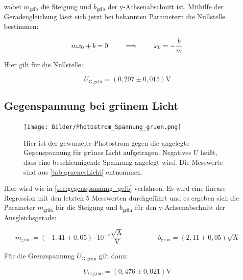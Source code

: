 \documentclass[titlepage = firstcover]{scrartcl}
\begin{document}
            wobei $m_{\text{gelb}}$ die Steigung und $b_{\text{gelb}}$ der y-Achsenabschnitt ist.
            Mithilfe der Geradengleichung lässt sich jetzt bei bekannten Parametern die Nullstelle bestimmen:

            \begin{equation}
              m x_0 + b = 0 \qquad \implies \qquad x_0 = - \frac{b}{m} \\
            \end{equation}

            Hier gilt für die Nullstelle:

            \begin{equation*}
              U_\text{G,gelb} = (0,297 \pm 0,015) \text{V}
            \end{equation*}

        \newpage
        \subsection{Gegenspannung bei grünem Licht}
            \begin{figure}[h]
              \centering
              \texttt{[image: Bilder/Photostrom\_Spannung\_gruen.png]}
              \caption{Hier ist der gewurzelte Photostrom gegen die angelegte Gegenspannung für grünes Licht aufgetragen. Negatives $U$ heißt, dass eine beschleunigende Spannung angelegt wird. Die Messwerte sind aus \autoref{tab:gruenesLicht} entnommen.}
              \label{fig:gelbesLicht}
            \end{figure}

            \FloatBarrier
        
            Hier wird wie in \autoref{sec:gegenspannung_gelb} verfahren. Es wird eine lineare Regression mit den letzten 5 Messwerten durchgeführt und es ergeben sich die Parameter $m_{\text{grün}}$ für die Steigung und $b_{\text{grün}}$ für den y-Achsenabschnitt der Ausgleichsgerade:

            \begin{equation*}
              m_{\text{grün}} = (-1,41 \pm 0,05) \cdot 10^{-4} \frac{\sqrt{\text{A}}}{\text{V}} \qquad \quad \qquad b_{\text{grün}} = (2,11 \pm 0,05) \sqrt{\text{A}}
            \end{equation*}

            Für die Grenzspannung $U_{\text{G,grün}}$ gilt dann:

            \begin{equation*}
              U_\text{G,grün} = (0,476 \pm 0,021) \text{V}
            \end{equation*}
\end{document}
